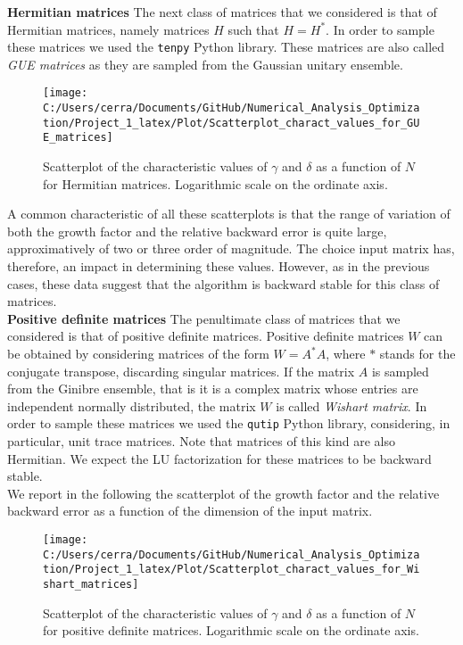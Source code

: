 \documentclass[a4paper,11pt]{report}
\begin{document}
\noindent \textbf{Hermitian matrices }  The next class of matrices that we considered is that of Hermitian matrices, namely matrices $H$ such that $H = H^{*}$. In order to sample these matrices we used the \texttt{tenpy} Python library. These matrices are also called \textit{GUE matrices} as they are sampled from the Gaussian unitary ensemble.

\begin{figure}[H]
	\centering
	\texttt{[image: C:/Users/cerra/Documents/GitHub/Numerical\_Analysis\_Optimization/Project\_1\_latex/Plot/Scatterplot\_charact\_values\_for\_GUE\_matrices]}
	\caption{Scatterplot of the characteristic values of $\gamma$ and $\delta$ as a function of $N$ for Hermitian matrices. Logarithmic scale on the ordinate axis.}
	\label{fig:Scatterplot_GUE}
\end{figure}

\noindent A common characteristic of all these scatterplots is that the range of variation of both the growth factor and the relative backward error is quite large, approximatively of two or three order of magnitude. The choice input matrix has, therefore, an impact in determining these values. However, as in the previous cases, these data suggest that the algorithm is backward stable for this class of matrices.\\

\noindent \textbf{Positive definite matrices } The penultimate class of matrices that we considered is that of positive definite matrices. Positive definite matrices $W$ can be obtained by considering matrices of the form $W = A^{*}A$, where $*$ stands for the conjugate transpose, discarding singular matrices. If the matrix $A$ is sampled from the Ginibre ensemble, that is it is a complex matrix whose entries are independent normally distributed, the matrix $W$ is called \textit{Wishart matrix}. In order to sample these matrices we used the \texttt{qutip} Python library, considering, in particular, unit trace matrices. Note that matrices of this kind are also Hermitian. We expect the LU factorization for these matrices to be backward stable.\\

\noindent We report in the following the scatterplot of the growth factor and the relative backward error as a function of the dimension of the input matrix.

\begin{figure}[H]
	\centering
	\texttt{[image: C:/Users/cerra/Documents/GitHub/Numerical\_Analysis\_Optimization/Project\_1\_latex/Plot/Scatterplot\_charact\_values\_for\_Wishart\_matrices]}
	\caption{Scatterplot of the characteristic values of $\gamma$ and $\delta$ as a function of $N$ for positive definite matrices. Logarithmic scale on the ordinate axis.}
	\label{fig:Scatterplot_Wishart}
\end{figure}
\end{document}
